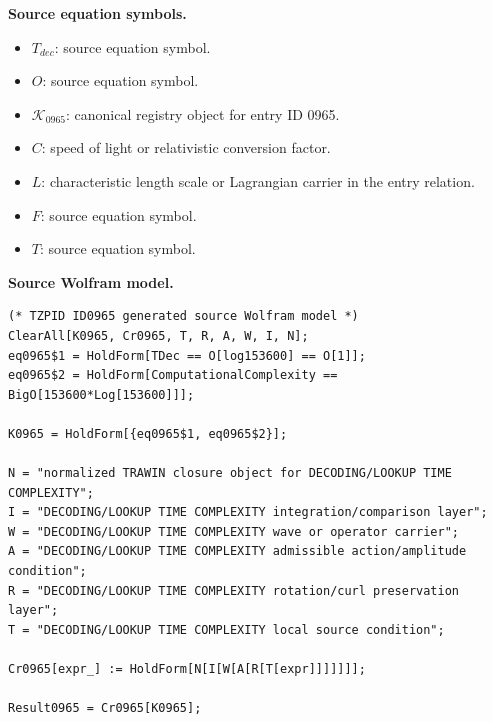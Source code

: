 \begin{minipage}[t]{0.49\linewidth}
\begingroup
\small
\raggedright
\textbf{Source equation symbols.}\par
\begin{itemize}[leftmargin=1.35em,itemsep=1pt,topsep=1pt,parsep=0pt]
    \item $T_{dec}$: source equation symbol.
    \item $O$: source equation symbol.
    \item $\mathcal{K}_{0965}$: canonical registry object for entry ID 0965.
    \item $C$: speed of light or relativistic conversion factor.
    \item $L$: characteristic length scale or Lagrangian carrier in the entry relation.
    \item $F$: source equation symbol.
    \item $T$: source equation symbol.
\end{itemize}
\endgroup
\end{minipage}\hfill
\begin{minipage}[t]{0.47\linewidth}
\begingroup
\scriptsize
\raggedright
\textbf{Source Wolfram model.}\par
\begin{Verbatim}[fontsize=\tiny,breaklines=true,breakanywhere=true]
(* TZPID ID0965 generated source Wolfram model *)
ClearAll[K0965, Cr0965, T, R, A, W, I, N];
eq0965$1 = HoldForm[TDec == O[log153600] == O[1]];
eq0965$2 = HoldForm[ComputationalComplexity == BigO[153600*Log[153600]]];

K0965 = HoldForm[{eq0965$1, eq0965$2}];

N = "normalized TRAWIN closure object for DECODING/LOOKUP TIME COMPLEXITY";
I = "DECODING/LOOKUP TIME COMPLEXITY integration/comparison layer";
W = "DECODING/LOOKUP TIME COMPLEXITY wave or operator carrier";
A = "DECODING/LOOKUP TIME COMPLEXITY admissible action/amplitude condition";
R = "DECODING/LOOKUP TIME COMPLEXITY rotation/curl preservation layer";
T = "DECODING/LOOKUP TIME COMPLEXITY local source condition";

Cr0965[expr_] := HoldForm[N[I[W[A[R[T[expr]]]]]]];

Result0965 = Cr0965[K0965];
\end{Verbatim}
\endgroup
\end{minipage}

